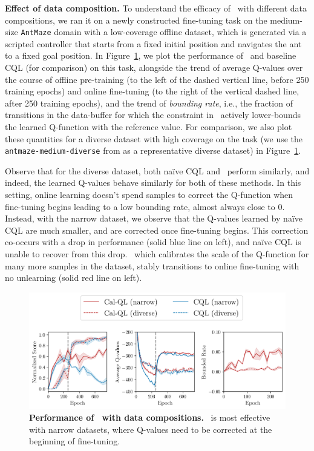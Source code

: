 \textbf{Effect of data composition.} To understand the efficacy of \methodname\ with different data compositions, we ran it on a newly constructed fine-tuning task on the medium-size \texttt{AntMaze} domain with a low-coverage offline dataset, which is generated via a scripted controller that starts from a fixed initial position and navigates the ant to a fixed goal position. In Figure~\ref{fig:ant-narrow}, we plot the performance of \methodname\ and baseline CQL (for comparison) on this task, alongside the trend of average Q-values over the course of offline pre-training (to the left of the dashed vertical line, before 250 training epochs) and online fine-tuning (to the right of the vertical dashed line, after 250 training epochs), and the trend of \emph{bounding rate}, i.e., the fraction of transitions in the data-buffer for which the constraint in \methodname\ actively lower-bounds the learned Q-function with the reference value. For comparison, we also plot these quantities for a diverse dataset with high coverage on the task (we use the \texttt{antmaze-medium-diverse} from \cite{fu2020d4rl} as a representative diverse dataset) in Figure~\ref{fig:ant-narrow}. 

Observe that for the diverse dataset, both na\"ive CQL and \methodname\ perform similarly, and indeed, the learned Q-values behave similarly for both of these methods. In this setting, online learning doesn't spend samples to correct the Q-function when fine-tuning begins leading to a low bounding rate, almost always close to 0. Instead, with the narrow dataset, we observe that the Q-values learned by na\"ive CQL are much smaller, and are corrected once fine-tuning begins. This correction co-occurs with a drop in performance (solid blue line on left), and na\"ive CQL is unable to recover from this drop. \methodname\, which calibrates the scale of the Q-function for many more samples in the dataset, stably transitions to online fine-tuning with no unlearning (solid red line on left). 

\begin{figure}
\vspace{-0.35cm}
\centering
\includegraphics[width=0.97\linewidth]{chapters/cal_ql/figs-sample/diagnose-1.png}
\vspace{-0.3cm}
\caption{
\footnotesize{\textbf{Performance of \methodname\ with data compositions.} \methodname\ is most effective with narrow datasets, where Q-values need to be corrected at the beginning of fine-tuning.}
}
\label{fig:ant-narrow}
\vspace{-0.35cm}
\end{figure}


